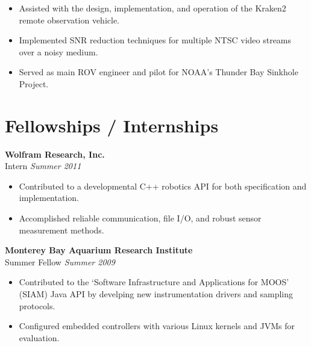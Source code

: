\documentclass{article}
\begin{document}
{\begin{multicols}{2}
    \vspace{ -10px}
    \begin{itemize}[noitemsep,nolistsep]
	\item Assisted with the design, implementation, and operation of the Kraken2 remote observation vehicle.
	\item Implemented SNR reduction techniques for multiple NTSC video streams over a noisy medium.
	\item Served as main ROV engineer and pilot for NOAA's Thunder Bay Sinkhole Project. 
    \end{itemize}
    \vspace{5px}
\section*{Fellowships / Internships}
\noindent
    \textbf{Wolfram Research, Inc. }\\
     Intern \hfill \textsl{Summer 2011} \\
    \vspace{ -10px}
    \begin{itemize}[noitemsep,nolistsep]
        \item Contributed to a developmental C++ robotics API for both specification and implementation.
	 \item Accomplished reliable communication, file I/O, and robust sensor measurement methods. 
    \end{itemize}
    \vspace{5px}
    \textbf{Monterey Bay Aquarium Research Institute}\\
     Summer Fellow \hfill \textsl{Summer 2009}  \\
    \vspace{ -10px}	
    \begin{itemize}[noitemsep,nolistsep]
	\item Contributed to the `Software Infrastructure and Applications for MOOS' (SIAM) Java API by develping new instrumentation drivers and sampling protocols.
	\item Configured embedded controllers with various Linux kernels and JVMs for evaluation.
    \end{itemize}
    \vspace{5px}

\end{multicols}}
\end{document}
